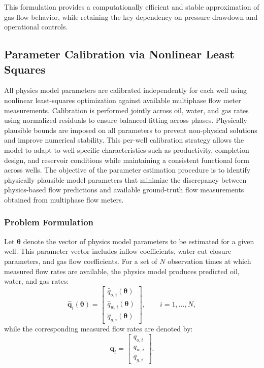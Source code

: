 \documentclass[12pt,APA]{uomthesis}
\begin{document}
This formulation provides a computationally efficient and stable approximation of gas flow behavior, while retaining the key dependency on pressure drawdown and operational controls.

\subsection{Parameter Calibration via Nonlinear Least Squares}
\label{subsec:parameter_calibration}
All physics model parameters are calibrated independently for each well using nonlinear least-squares optimization against available multiphase flow meter measurements. Calibration is performed jointly across oil, water, and gas rates using normalized residuals to ensure balanced fitting across phases.
Physically plausible bounds are imposed on all parameters to prevent non-physical solutions and improve numerical stability. This per-well calibration strategy allows the model to adapt to well-specific characteristics such as productivity, completion design, and reservoir conditions while maintaining a consistent functional form across wells.
The objective of the parameter estimation procedure is to identify physically plausible model parameters that minimize the discrepancy between physics-based flow predictions and available ground-truth flow measurements obtained from multiphase flow meters.

\subsubsection{Problem Formulation}

Let $\boldsymbol{\theta}$ denote the vector of physics model parameters to be estimated for a given well. This parameter vector includes inflow coefficients, water-cut closure parameters, and gas flow coefficients. For a set of $N$ observation times at which measured flow rates are available, the physics model produces predicted oil, water, and gas rates:
\begin{equation}
\hat{\mathbf{q}}_i(\boldsymbol{\theta}) =
\begin{bmatrix}
\hat{q}_{o,i}(\boldsymbol{\theta}) \\
\hat{q}_{w,i}(\boldsymbol{\theta}) \\
\hat{q}_{g,i}(\boldsymbol{\theta})
\end{bmatrix},
\qquad i = 1, \ldots, N,
\end{equation}
while the corresponding measured flow rates are denoted by:
\begin{equation}
\mathbf{q}_i =
\begin{bmatrix}
q_{o,i} \\
q_{w,i} \\
q_{g,i}
\end{bmatrix}.
\end{equation}
\end{document}

